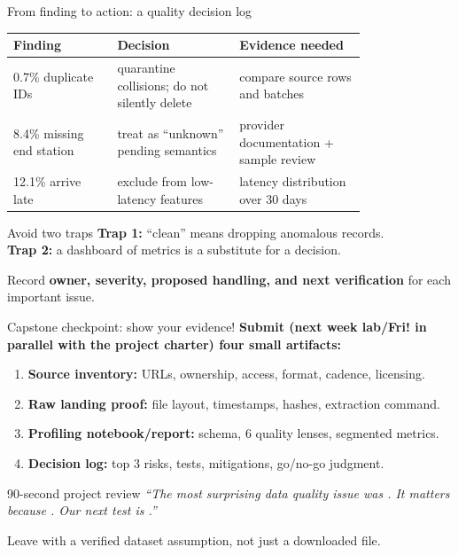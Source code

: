 \documentclass[aspectratio=43,10pt]{beamer}
\begin{document}
\begin{frame}{From finding to action: a quality decision log}
\small
\begin{tabular}{p{0.23\linewidth}p{0.27\linewidth}p{0.29\linewidth}}
\toprule
\textbf{Finding} & \textbf{Decision} & \textbf{Evidence needed}\\
\midrule
0.7\% duplicate IDs & quarantine collisions; do not silently delete & compare source rows and batches\\
8.4\% missing end station & treat as ``unknown'' pending semantics & provider documentation + sample review\\
12.1\% arrive late & exclude from low-latency features & latency distribution over 30 days\\
\bottomrule
\end{tabular}
\vspace{0.8em}
\begin{block}{Avoid two traps}
\textbf{Trap 1:} ``clean'' means dropping anomalous records.\\
\textbf{Trap 2:} a dashboard of metrics is a substitute for a decision.
\end{block}
Record \textbf{owner, severity, proposed handling, and next verification} for each important issue.
\end{frame}

\begin{frame}{Capstone checkpoint: show your evidence!}
\textbf{Submit (next week lab/Fri! in parallel with the project charter) four small artifacts:}
\begin{enumerate}
\item \textbf{Source inventory:} URLs, ownership, access, format, cadence, licensing.
\item \textbf{Raw landing proof:} file layout, timestamps, hashes, extraction command.
\item \textbf{Profiling notebook/report:} schema, 6 quality lenses, segmented metrics.
\item \textbf{Decision log:} top 3 risks, tests, mitigations, go/no-go judgment.
\end{enumerate}
\vspace{0.6em}
\begin{block}{90-second project review}
\emph{``The most surprising data quality issue was \underline{\hspace{2cm}}. It matters because \underline{\hspace{2cm}}. Our next test is \underline{\hspace{2cm}}.''}
\end{block}
\centering \alert{Leave with a verified dataset assumption, not just a downloaded file.}
\end{frame}
\end{document}
